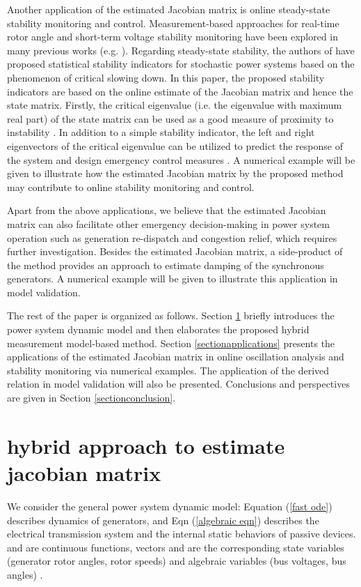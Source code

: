 \documentclass[journal]{IEEEtran}
\begin{document}
Another application of the estimated Jacobian matrix is online steady-state stability monitoring and control. Measurement-based approaches for real-time rotor angle and short-term voltage stability monitoring have been explored in many previous works (e.g. \cite{CCLiu:2011}\cite{Ajjarapu:2013}). Regarding steady-state stability, the authors of \cite{Hines:2015}\cite{Hines:2014} have proposed statistical stability indicators for stochastic power systems based on the phenomenon of critical slowing down. In this paper, the proposed stability indicators are based on the online estimate of the Jacobian matrix and hence the state matrix. Firstly, the critical eigenvalue (i.e. the eigenvalue with maximum real part) of the state matrix can be used as a good measure of proximity to instability \cite{Kundur:1992}. In addition to a simple stability indicator, the left and right eigenvectors of the critical eigenvalue can be utilized to predict the response of the system and design emergency control measures \cite{Hill:1993}\cite{Cutsem:book}. A numerical example will be given to illustrate how the estimated Jacobian matrix by the proposed method may contribute to online stability monitoring and control.


Apart from the above applications, we believe that the estimated Jacobian matrix can also facilitate other emergency decision-making in power system operation such as generation re-dispatch and congestion relief, which requires further investigation. Besides the estimated Jacobian matrix, a side-product of the method provides an approach to estimate damping of the synchronous generators. A numerical example will be given to illustrate this application in model validation.

The rest of the paper is organized as follows. Section \ref{sectionmodel} briefly introduces the power system dynamic model and then elaborates the proposed hybrid measurement model-based method. Section \ref{sectionapplications} presents the applications of the estimated Jacobian matrix in online oscillation analysis and stability monitoring via numerical examples. The application of the derived relation in model validation will also be presented. Conclusions and perspectives are given in Section \ref{sectionconclusion}.

\section{hybrid approach to estimate jacobian matrix}\label{sectionmodel}
We consider the general power system dynamic model: 
Equation (\ref{fast ode}) describes dynamics of generators, and Eqn (\ref{algebraic eqn}) describes the electrical transmission system and the internal static behaviors of passive devices.  and  are continuous functions, vectors  and  are the corresponding state variables (generator rotor angles, rotor speeds) and algebraic variables (bus voltages, bus angles) \cite{Wangxz:CAS}.
\end{document}
